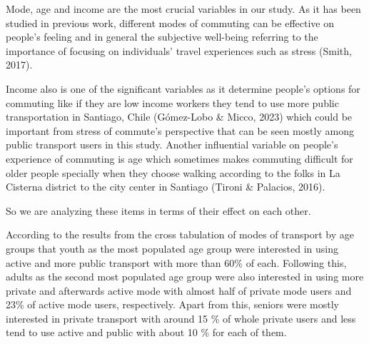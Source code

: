 \documentclass[
11pt, %
oneside, %
english, %
singlespacing, %
]{macthesis} %
\begin{document}
Mode, age and income are the most crucial variables in our study. As it has been studied in previous work, different modes of commuting can be effective on people's feeling and in general the subjective well-being referring to the importance of focusing on individuals' travel experiences such as stress (Smith, 2017).

Income also is one of the significant variables as it determine people's options for commuting like if they are low income workers they tend to use more public transportation in Santiago, Chile (Gómez-Lobo \& Micco, 2023) which could be important from stress of commute's perspective that can be seen mostly among public transport users in this study. Another influential variable on people's experience of commuting is age which sometimes makes commuting difficult for older people specially when they choose walking according to the folks in La Cisterna district to the city center in Santiago (Tironi \& Palacios, 2016).

So we are analyzing these items in terms of their effect on each other.

According to the results from the cross tabulation of modes of transport by age groups that youth as the most populated age group were interested in using active and more public transport with more than 60\% of each. Following this, adults as the second most populated age group were also interested in using more private and afterwards active mode with almost half of private mode users and 23\% of active mode users, respectively. Apart from this, seniors were mostly interested in private transport with around 15 \% of whole private users and less tend to use active and public with about 10 \% for each of them.
\end{document}
